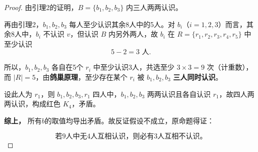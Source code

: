 \documentclass[utf8]{ctexart}
\theoremstyle{mystyle}
\begin{document}
\begin{proof}
由引理2的证明，$B = \{b_1, b_2, b_3\}$ 内三人两两认识。

再由引理2，$b_1, b_2, b_3$ 每人至少认识其余8人中的5人。对 $b_i$（$i=1,2,3$）而言，其余8人中，$b_i$ 不认识 $v$，但认识 $B$ 内另外两人，故 $b_i$ 在 $R = \{r_1, r_2, r_3, r_4, r_5\}$ 中至少认识
\[
  5 - 2 = 3 \text{ 人}.
\]

所以，$b_1, b_2, b_3$ 各自在5个 $r_i$ 中至少认识3人，共选至少 $3 \times 3 = 9$ 次（计重数），而 $|R|=5$，由\textbf{鸽巢原理}，至少存在某个 $r_i$ 被 $b_1, b_2, b_3$ \textbf{三人同时认识}。

设此人为 $r_1$，则 $b_1, b_2, b_3, r_1$ 四人中，$b_1, b_2, b_3$ 两两认识且各自认识 $r_1$，故四人两两认识，构成红色 $K_4$，矛盾。

\medskip

\textbf{综上，}
所有$b$的取值均导出矛盾。故反证假设不成立，原命题得证：

\[
  \boxed{\text{若9人中无4人互相认识，则必有3人互相不认识。}}
\]

\end{proof}
\end{document}
